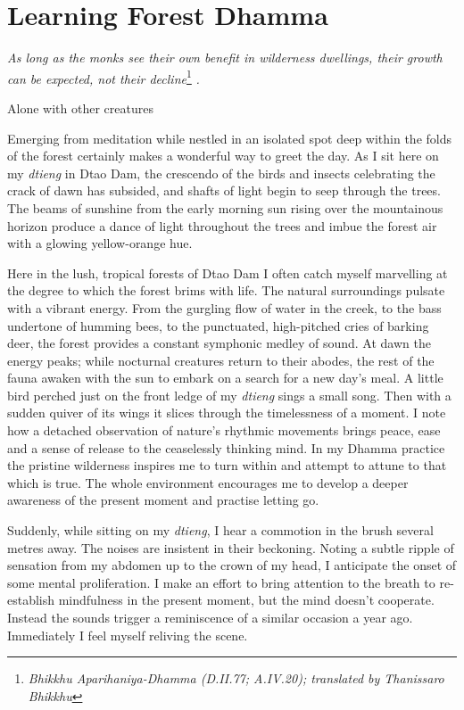 

\chapter{Learning Forest Dhamma}
\markright{\chapterAuthor}

\emph{As long as the monks see their own benefit in wilderness
dwellings, their growth can be expected, not their decline}\footnote{\emph{Bhikkhu
  Aparihaniya-Dhamma (D.II.77; A.IV.20); translated by Thanissaro
  Bhikkhu}} \emph{.}

Alone with other creatures

Emerging from meditation while nestled in an isolated spot deep within
the folds of the forest certainly makes a wonderful way to greet the
day. As I sit here on my \emph{dtieng} in Dtao Dam, the crescendo of the
birds and insects celebrating the crack of dawn has subsided, and shafts
of light begin to seep through the trees. The beams of sunshine from the
early morning sun rising over the mountainous horizon produce a dance of
light throughout the trees and imbue the forest air with a glowing
yellow-orange hue.

Here in the lush, tropical forests of Dtao Dam I often catch myself
marvelling at the degree to which the forest brims with life. The
natural surroundings pulsate with a vibrant energy. From the gurgling
flow of water in the creek, to the bass undertone of humming bees, to
the punctuated, high-pitched cries of barking deer, the forest provides
a constant symphonic medley of sound. At dawn the energy peaks; while
nocturnal creatures return to their abodes, the rest of the fauna awaken
with the sun to embark on a search for a new day's meal. A little bird
perched just on the front ledge of my \emph{dtieng} sings a small song.
Then with a sudden quiver of its wings it slices through the
timelessness of a moment. I note how a detached observation of nature's
rhythmic movements brings peace, ease and a sense of release to the
ceaselessly thinking mind. In my Dhamma practice the pristine wilderness
inspires me to turn within and attempt to attune to that which is true.
The whole environment encourages me to develop a deeper awareness of the
present moment and practise letting go.

Suddenly, while sitting on my \emph{dtieng}, I hear a commotion in the
brush several metres away. The noises are insistent in their beckoning.
Noting a subtle ripple of sensation from my abdomen up to the crown of
my head, I anticipate the onset of some mental proliferation. I make an
effort to bring attention to the breath to re-establish mindfulness in
the present moment, but the mind doesn't cooperate. Instead the sounds
trigger a reminiscence of a similar occasion a year ago. Immediately I
feel myself reliving the scene.

